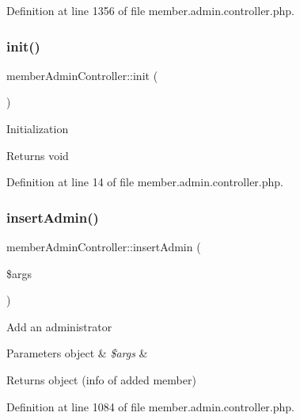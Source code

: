 Definition at line 1356 of file member.\+admin.\+controller.\+php.

\hypertarget{classmemberAdminController_a6c8b7afa8a1e9de99069b819d30d4f4f}{}\label{classmemberAdminController_a6c8b7afa8a1e9de99069b819d30d4f4f} 
\subsubsection{\texorpdfstring{init()}{init()}}
{\footnotesize\ttfamily member\+Admin\+Controller\+::init (\begin{DoxyParamCaption}{ }\end{DoxyParamCaption})}

Initialization \begin{DoxyReturn}{Returns}
void 
\end{DoxyReturn}


Definition at line 14 of file member.\+admin.\+controller.\+php.

\hypertarget{classmemberAdminController_ae2e8fdc055d7a9cc3b5eff067a709544}{}\label{classmemberAdminController_ae2e8fdc055d7a9cc3b5eff067a709544} 
\subsubsection{\texorpdfstring{insert\+Admin()}{insertAdmin()}}
{\footnotesize\ttfamily member\+Admin\+Controller\+::insert\+Admin (\begin{DoxyParamCaption}\item[{}]{\$args }\end{DoxyParamCaption})}

Add an administrator 
\begin{DoxyParams}[1]{Parameters}
object & {\em \$args} & \\
\hline
\end{DoxyParams}
\begin{DoxyReturn}{Returns}
object (info of added member) 
\end{DoxyReturn}


Definition at line 1084 of file member.\+admin.\+controller.\+php.

\hypertarget{classmemberAdminController_a568d276708e1c5c4cf47d40741909b1a}{}\label{classmemberAdminController_a568d276708e1c5c4cf47d40741909b1a} 
